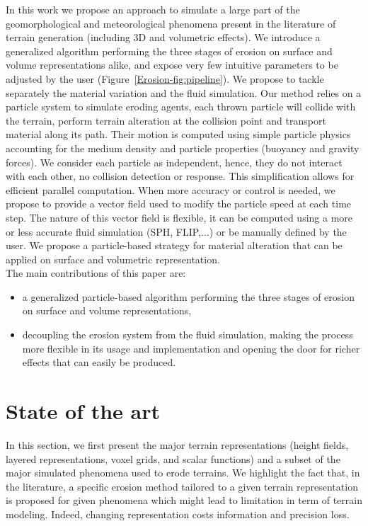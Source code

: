 In this work we propose an approach to simulate a large part of the geomorphological and meteorological phenomena present in the literature of terrain generation (including 3D and volumetric effects). We introduce a generalized algorithm performing the three stages of erosion on surface and volume representations alike, and expose very few intuitive parameters to be adjusted by the user (Figure~\ref{Erosion-fig:pipeline}).
We propose to tackle separately the material variation and the fluid simulation. Our method relies on a particle system to simulate eroding agents, each thrown particle will collide with the terrain, perform terrain alteration at the collision point and transport material along its path. 
Their motion is computed using simple particle physics accounting for the medium density and particle properties (buoyancy and gravity forces). We consider each particle as independent, hence, they do not interact with each other, no collision detection or response. This simplification allows for efficient parallel computation. 
When more accuracy or control is needed, we propose to provide a vector field used to modify the particle speed at each time step. The nature of this vector field is flexible, it can be computed using a more or less accurate fluid simulation (SPH, FLIP,...) or be manually defined by the user. We propose a particle-based strategy for material alteration that can be applied on surface and volumetric representation. \\
The main contributions of this paper are: 
\begin{itemize}
\item a generalized particle-based algorithm performing the three
stages of erosion on surface and volume representations,
\item decoupling the erosion system from the fluid simulation, making the process more flexible in its usage and implementation and opening the door for richer effects that can easily be produced.
\end{itemize}
\section{State of the art}
\label{sec:state_of_the_art}
In this section, we first present the major terrain representations (height fields, layered representations, voxel grids, and scalar functions) and a subset of the major simulated phenomena used to erode terrains. We highlight the fact that, in the literature, a specific erosion method tailored to a given terrain representation is proposed for given phenomena which might lead to limitation in term of terrain modeling. Indeed, changing representation costs information and precision loss.
